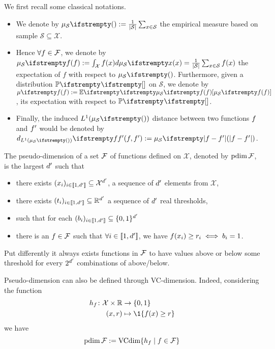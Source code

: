 We first recall some classical notations.
\begin{itemize}
	\item We denote by $\empdistr{\mathcal{S}}{}:=\frac{1}{|\mathcal{S}|} \sum_{x \in \mathcal{S}}$ the empirical measure based on sample $\mathcal{S}  \subseteq \mathcal{X}$. 
	\item Hence $\forall f \in \mathcal{F}$, we denote by $\empdistr{\mathcal{S}}{\query}:=\int_{\mathcal{X}} \query(x) d\empdistr{\mathcal{S}}{x} = \frac{1}{|\mathcal{S}|} \sum_{x \in \mathcal{S}} \query(x)$ the expectation of $f$ with respect to $\empdistr{\mathcal{S}}{}$. Furthermore, given a distribution $\PP{}{}$ on $\mathcal{S}$, we denote by $\meanempdistr{f}:=\EE{}{\empdistr{\mathcal{S}}{\query}}$, its expectation with respect to $\PP{}{}$. 
	\item Finally, the induced $L^1(\empdistr{\mathcal{S}}{})$ distance between two functions $f$ and $f'$ would be denoted by $\dlone{\empdistr{\mathcal{S}}{}}{\query}{\query'}:=\empdistr{\mathcal{S}}{|\query - \query'|}$.
\end{itemize}  


\begin{tcolorbox}
	\begin{definition}
		The pseudo-dimension of a set $\mathcal{F}$ of functions defined on $\mathcal{X}$, denoted by $\operatorname{pdim}\mathcal{F}$, is the largest ${d^{\prime}}$ such that 
	\begin{itemize}
		\item there exists $(x_{i})_{i\in \llbracket 1,{d^{\prime}} \rrbracket} \subseteq \mathcal{X}^{d^{\prime}}$, a sequence of ${d^{\prime}}$ elements from $\mathcal{X}$,
		\item there exists $(t_i)_{i\in \llbracket 1,{d^{\prime}} \rrbracket} \subseteq  \mathbb{R}^{d^{\prime}}$ a sequence of ${d^{\prime}}$ real thresholds,
		\item such that for each $(b_i)_{i\in \llbracket 1,{d^{\prime}} \rrbracket} \subseteq \{0,1\}^{d^{\prime}}$
		\item there is an $f \in \mathcal{F}$ such that $\forall i \in \llbracket 1,{d^{\prime}} \rrbracket$, we have $f(x_i) \geq r_i \iff b_i = 1$. 
	\end{itemize}
	Put differently it always exists functions in $\mathcal{F}$ to have values above or below some threshold for every $2^{d^{\prime}}$ combinations of above/below.
\end{definition}
Pseudo-dimension can also be defined through VC-dimension. Indeed, considering the function
\begin{align*}
	h_\query \colon \mathcal{X} \times \RR &\to \{0,1\}\\
	(x,r) &\mapsto \1\{f(x) \geq r\}
\end{align*}
we have
\begin{equation}
	\operatorname{pdim}\mathcal{F} := \operatorname{VCdim}\{h_f \mid f \in \mathcal{F}\}
\end{equation}
\end{tcolorbox}








